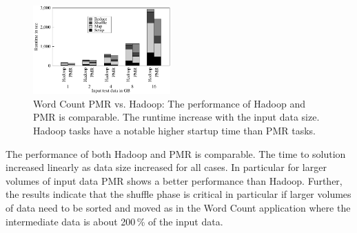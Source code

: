 \documentclass{acm_proc_article-sp}
\newcommand{\pnote}[1]{ {\textcolor{magenta} { ***pradeep: #1 }}}
\newcommand{\pnote}[1]{}
\begin{document}
\begin{figure}[ht]
	\centering
		\includegraphics[width=0.47\textwidth]{figures/wc_pmr_hmr.pdf}
\caption{Word Count PMR vs. Hadoop: The performance of Hadoop and PMR is 
comparable. The runtime increase with the input data size. Hadoop tasks have a 
notable higher startup time than PMR tasks.} 	
\label{fig:figures_wc_pmr_hmr}
\end{figure}		
	
The performance of both Hadoop and PMR is comparable. The time to solution 
increased linearly as data size increased for all cases. In particular for 
larger volumes of input data PMR shows a better performance than Hadoop. 
Further, the results indicate that the shuffle phase is critical in particular 
if larger volumes of data need to be sorted and moved as in the Word Count 
application where the intermediate data is about 200\,\% of the input data.



\end{document}

